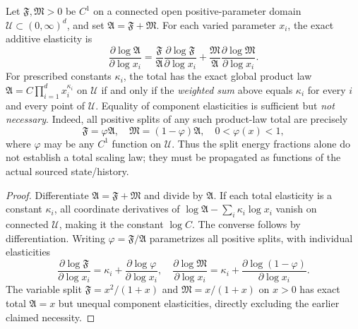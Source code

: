 \documentclass[12pt,a4paper]{article}
\begin{document}
\begin{proposition}
\label{p9:cor:closed-abundance-scaling}
Let \(\mathfrak F,\mathfrak M>0\) be \(C^1\) on a connected open
positive-parameter domain \(\mathcal U\subset(0,\infty)^d\), and set
\(\mathfrak A=\mathfrak F+\mathfrak M\).  For each varied parameter
\(x_i\), the exact additive elasticity is
\begin{equation}
\label{p9:eq:additive-elasticity}
\frac{\partial\log\mathfrak A}{\partial\log x_i}
=\frac{\mathfrak F}{\mathfrak A}
 \frac{\partial\log\mathfrak F}{\partial\log x_i}
+\frac{\mathfrak M}{\mathfrak A}
 \frac{\partial\log\mathfrak M}{\partial\log x_i}.
\end{equation}
For prescribed constants \(\kappa_i\), the total has the exact global
product law \(\mathfrak A=C\prod_{i=1}^d x_i^{\kappa_i}\) on
\(\mathcal U\) if and only if the \emph{weighted sum} above equals
\(\kappa_i\) for every \(i\) and every point of \(\mathcal U\).
Equality of component elasticities is sufficient but \emph{not necessary}.
Indeed, all positive splits of any such product-law total are precisely
\begin{equation}
\label{p9:eq:v1201-homogeneous-positive-partitions}
 \boxed{\mathfrak F=\varphi\mathfrak A,\quad
 \mathfrak M=(1-\varphi)\mathfrak A,\quad
 0<\varphi(x)<1,}
\end{equation}
where \(\varphi\) may be any \(C^1\) function on \(\mathcal U\).
Thus the split energy fractions alone do not establish a total scaling law;
they must be propagated as functions of the actual sourced state/history.
\end{proposition}

\begin{proof}
Differentiate \(\mathfrak A=\mathfrak F+\mathfrak M\) and divide by
\(\mathfrak A\).  If each total elasticity is a constant \(\kappa_i\),
all coordinate derivatives of
\(\log\mathfrak A-\sum_i\kappa_i\log x_i\) vanish on connected
\(\mathcal U\), making it the constant \(\log C\).  The converse follows
by differentiation.  Writing \(\varphi=\mathfrak F/\mathfrak A\)
parametrizes all positive splits, with individual elasticities
\[
 \frac{\partial\log\mathfrak F}{\partial\log x_i}
 =\kappa_i+\frac{\partial\log\varphi}{\partial\log x_i},\quad
 \frac{\partial\log\mathfrak M}{\partial\log x_i}
 =\kappa_i+\frac{\partial\log(1-\varphi)}{\partial\log x_i}.
\]
The variable split \(\mathfrak F=x^2/(1+x)\) and
\(\mathfrak M=x/(1+x)\) on \(x>0\) has exact total
\(\mathfrak A=x\) but unequal component elasticities, directly excluding
the earlier claimed necessity.
\end{proof}
\end{document}
